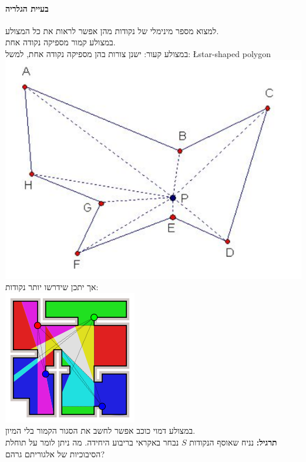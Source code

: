 \documentclass{article}
\begin{document}
\paragraph{בעיית הגלריה }
למצוא מספר מינימלי של נקודות מהן אפשר לראות את כל המצולע.\\
במצולע קמור מספיקה נקודה אחת.\\
במצולע קעור: ישנן צורות בהן מספיקה נקודה אחת, למשל: \L{star-shaped polygon}\\
\includegraphics[scale=0.3]{z3.png}
\\
אך יתכן שידרשו יותר נקודות:\\
\includegraphics[scale=0.3]{z2.png}
\\
במצולע דמוי כוכב אפשר לחשב את הסגור הקמור בלי המיון.\\


\noindent\textbf{תרגיל:} נניח שאוסף הנקודות $S$ נבחר באקראי בריבוע היחידה. מה ניתן לומר על תוחלת הסיבוכיות של אלגוריתם גרהם?
\end{document}
